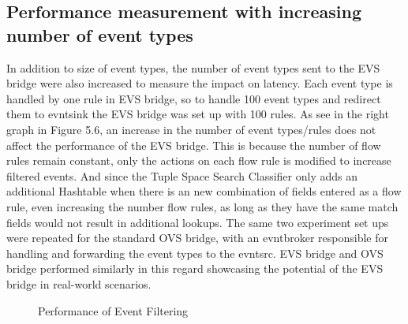 \subsection{Performance measurement with increasing number of event types }	
In addition to size of event types, the number of event types sent to the EVS bridge were also increased to measure the impact on latency. Each event type is handled by one rule in EVS bridge, so to handle 100 event types and redirect them to evntsink the EVS bridge was set up with 100 rules. As see in the right graph in Figure 5.6, an increase in the number of event types/rules does not affect the performance of the EVS bridge. This is because the number of flow rules remain constant, only the actions on each flow rule is modified to increase filtered events. And since the Tuple Space Search Classifier only adds an additional Hashtable when there is an new combination of fields entered as a flow rule, even increasing the number flow rules, as long as they have the same match fields would not result in additional lookups.
The same two experiment set ups were repeated for the standard OVS bridge, with an evntbroker responsible for handling and forwarding the event types to the evntsrc. EVS bridge and OVS bridge performed similarly in this regard showcasing the potential of the EVS bridge in real-world scenarios.



\begin{figure}[H]
	\centering
	\caption{Performance of Event Filtering}
\end{figure}	

